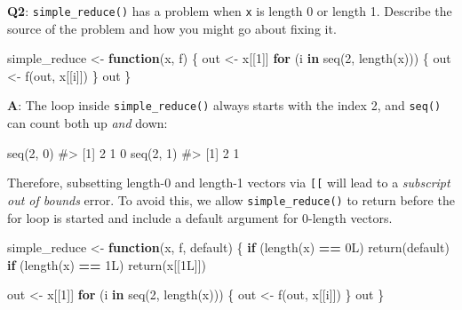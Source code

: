 \documentclass[
]{krantz}
\makeatletter
\newenvironment{Shaded}{\begin{snugshade}}{\end{snugshade}}
\newcommand{\CommentTok}[1]{\textcolor[rgb]{0.56,0.35,0.01}{\textit{#1}}}
\newcommand{\ControlFlowTok}[1]{\textcolor[rgb]{0.13,0.29,0.53}{\textbf{#1}}}
\newcommand{\DecValTok}[1]{\textcolor[rgb]{0.00,0.00,0.81}{#1}}
\newcommand{\KeywordTok}[1]{\textcolor[rgb]{0.13,0.29,0.53}{\textbf{#1}}}
\newcommand{\NormalTok}[1]{#1}
\newcommand{\OperatorTok}[1]{\textcolor[rgb]{0.81,0.36,0.00}{\textbf{#1}}}
\newcommand{\StringTok}[1]{\textcolor[rgb]{0.31,0.60,0.02}{#1}}
\newenvironment{kframe}{%
\medskip{}
\setlength{\fboxsep}{.8em}
 \def\at@end@of@kframe{}%
 \ifinner\ifhmode%
  \def\at@end@of@kframe{\end{minipage}}%
  \begin{minipage}{\columnwidth}%
 \fi\fi%
 \def\FrameCommand##1{\hskip\@totalleftmargin \hskip-\fboxsep
 \colorbox{shadecolor}{##1}\hskip-\fboxsep
     \hskip-\linewidth \hskip-\@totalleftmargin \hskip\columnwidth}%
 \MakeFramed {\advance\hsize-\width
   \@totalleftmargin\z@ \linewidth\hsize
   \@setminipage}}%
 {\par\unskip\endMakeFramed%
 \at@end@of@kframe}
\renewenvironment{Shaded}{\begin{kframe}}{\end{kframe}}
\renewcommand{\KeywordTok} [1]{\textcolor[rgb]{0.00,0.44,0.13}{{#1}}}
\renewcommand{\DecValTok}  [1]{\textcolor[rgb]{0.25,0.63,0.44}{{#1}}}
\renewcommand{\StringTok}  [1]{\textcolor[rgb]{0.25,0.44,0.63}{{#1}}}
\renewcommand{\CommentTok} [1]{\textcolor[rgb]{0.38,0.63,0.69}{{#1}}}
\renewcommand{\NormalTok}  [1]{{#1}}
\makeatother
\begin{document}
\textbf{{Q2}}: \texttt{simple\_reduce()} has a problem when \texttt{x} is length 0 or length 1. Describe the source of the problem and how you might go about fixing it.

\begin{Shaded}
\begin{Highlighting}[]
\NormalTok{simple_reduce <-}\StringTok{ }\ControlFlowTok{function}\NormalTok{(x, f) \{}
\NormalTok{  out <-}\StringTok{ }\NormalTok{x[[}\DecValTok{1}\NormalTok{]]}
  \ControlFlowTok{for}\NormalTok{ (i }\ControlFlowTok{in} \KeywordTok{seq}\NormalTok{(}\DecValTok{2}\NormalTok{, }\KeywordTok{length}\NormalTok{(x))) \{}
\NormalTok{    out <-}\StringTok{ }\KeywordTok{f}\NormalTok{(out, x[[i]])}
\NormalTok{  \}}
\NormalTok{  out}
\NormalTok{\}}
\end{Highlighting}
\end{Shaded}

\textbf{{A}}: The loop inside \texttt{simple\_reduce()} always starts with the index 2, and \texttt{seq()} can count both up \emph{and} down:

\begin{Shaded}
\begin{Highlighting}[]
\KeywordTok{seq}\NormalTok{(}\DecValTok{2}\NormalTok{, }\DecValTok{0}\NormalTok{)}
\CommentTok{#> [1] 2 1 0}
\KeywordTok{seq}\NormalTok{(}\DecValTok{2}\NormalTok{, }\DecValTok{1}\NormalTok{)}
\CommentTok{#> [1] 2 1}
\end{Highlighting}
\end{Shaded}

Therefore, subsetting length-0 and length-1 vectors via \texttt{{[}{[}} will lead to a \emph{subscript out of bounds} error. To avoid this, we allow \texttt{simple\_reduce()} to return before the for loop is started and include a default argument for 0-length vectors.

\begin{Shaded}
\begin{Highlighting}[]
\NormalTok{simple_reduce <-}\StringTok{ }\ControlFlowTok{function}\NormalTok{(x, f, default) \{}
  \ControlFlowTok{if}\NormalTok{ (}\KeywordTok{length}\NormalTok{(x) }\OperatorTok{==}\StringTok{ }\NormalTok{0L) }\KeywordTok{return}\NormalTok{(default)}
  \ControlFlowTok{if}\NormalTok{ (}\KeywordTok{length}\NormalTok{(x) }\OperatorTok{==}\StringTok{ }\NormalTok{1L) }\KeywordTok{return}\NormalTok{(x[[1L]])}
  
\NormalTok{  out <-}\StringTok{ }\NormalTok{x[[}\DecValTok{1}\NormalTok{]]}
  \ControlFlowTok{for}\NormalTok{ (i }\ControlFlowTok{in} \KeywordTok{seq}\NormalTok{(}\DecValTok{2}\NormalTok{, }\KeywordTok{length}\NormalTok{(x))) \{}
\NormalTok{    out <-}\StringTok{ }\KeywordTok{f}\NormalTok{(out, x[[i]])}
\NormalTok{  \}}
\NormalTok{  out}
\NormalTok{\}}
\end{Highlighting}
\end{Shaded}
\end{document}
